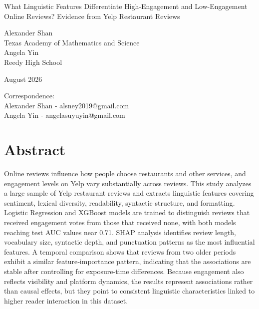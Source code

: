 \begin{titlepage}
\centering

{\Huge What Linguistic Features Differentiate High-Engagement and Low-Engagement Online Reviews? Evidence from Yelp Restaurant Reviews\par}

\vspace{1.5cm}

{\Large
Alexander Shan \\
\vspace{0.1cm}
Texas Academy of Mathematics and Science \\
\vspace{0.5cm}
Angela Yin \\
\vspace{0.1cm}
Reedy High School
}

\vspace{1.5cm}

{\large August 2026}

\vfill

{\small
Correspondence: \\
Alexander Shan - alsney2019@gmail.com \\
Angela Yin - angelasuyuyin@gmail.com 
}

\vspace{0.5cm}

\end{titlepage}

\fontsize{12pt}{12pt}\selectfont

\hypertarget{abstract}{%
\section{Abstract}\label{abstract}}

Online reviews influence how people choose restaurants and other
services, and engagement levels on Yelp vary substantially across
reviews. This study analyzes a large sample of Yelp restaurant reviews
and extracts linguistic features covering sentiment, lexical diversity,
readability, syntactic structure, and formatting. Logistic Regression
and XGBoost models are trained to distinguish reviews that received
engagement votes from those that received none, with both models
reaching test AUC values near 0.71. SHAP analysis identifies review
length, vocabulary size, syntactic depth, and punctuation patterns as
the most influential features. A temporal comparison shows that reviews
from two older periods exhibit a similar feature‑importance pattern,
indicating that the associations are stable after controlling for
exposure‑time differences. Because engagement also reflects visibility
and platform dynamics, the results represent associations rather than
causal effects, but they point to consistent linguistic characteristics
linked to higher reader interaction in this dataset.

